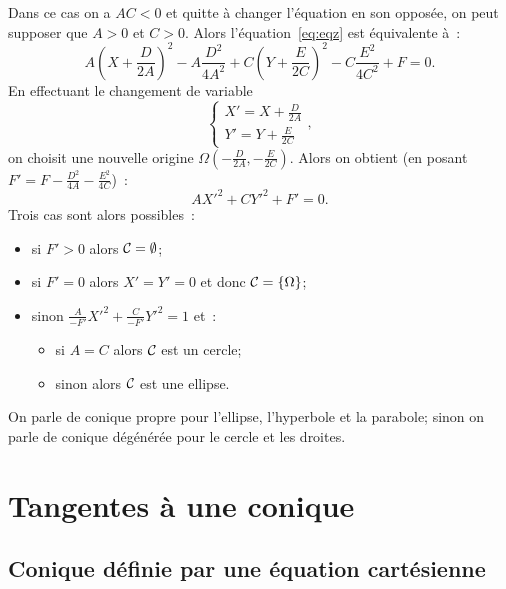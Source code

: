 Dans ce cas on a \(AC<0\) et quitte à changer l'équation en son opposée, on
peut supposer que \(A>0\) et \(C>0\). Alors l'équation~\eqref{eq:eqz} est
équivalente à~:
\begin{equation}
  A\left(X + \frac{D}{2A}\right)^2 -A\frac{D^2}{4A^2} +
  C\left(Y + \frac{E}{2C}\right)^2 -C\frac{E^2}{4C^2} + F = 0.
\end{equation}
En effectuant le changement de variable
\begin{equation}
  \begin{cases}
    X' = X + \frac{D}{2A}\\Y' = Y + \frac{E}{2C}
  \end{cases},
\end{equation}
on choisit une nouvelle origine
\(\Omega\left(-\frac{D}{2A},-\frac{E}{2C}\right)\). Alors on obtient (en
posant \(F' = F-\frac{D^2}{4A}-\frac{E^2}{4C}\))~:
\begin{equation}
  AX'^2 + CY'^2 + F' = 0.
\end{equation}
Trois cas sont alors possibles~:
\begin{itemize}
  \item si \(F'>0\) alors \(\mathcal{C}_{{}} = \emptyset\);
  \item si \(F' = 0\) alors \(X' = Y' = 0\) et donc \(\mathcal{C}_{{}} = \{\Omega\}\);
  \item sinon \(\frac{A}{-F'}X'^2 + \frac{C}{-F'}Y'^2 = 1\) et~:
    \begin{itemize}
      \item si \(A = C\) alors \(\mathcal{C}_{{}}\) est un cercle;
      \item sinon alors \(\mathcal{C}_{{}}\) est une ellipse.
    \end{itemize}
\end{itemize}
On parle de conique propre pour l'ellipse, l'hyperbole et la parabole; sinon
on parle de conique dégénérée pour le cercle et les droites.

\section{Tangentes à une conique}

\subsection{Conique définie par une équation cartésienne}

